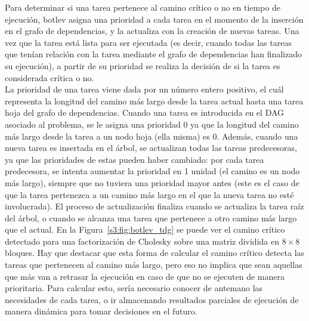 Para determinar si una tarea pertenece al camino crítico o no en tiempo de
ejecución, botlev asigna una prioridad a cada tarea en el momento de la
inserción en el grafo de dependencias, y la actualiza con la creación de
nuevas tareas. Una vez que la tarea está lista para ser ejecutada (es
decir, cuando todas las tareas que tenían relación con la tarea mediante el
grafo de dependencias han finalizado su ejecución), a partir de su
prioridad se realiza la decisión de si la tarea es considerada crítica o no.\\
La prioridad de una tarea viene dada por un número entero positivo, el cuál
representa la longitud del camino más largo desde la tarea actual hasta una
tarea hoja del grafo de dependencias. Cuando una tarea es introducida en el
DAG asociado al problema, se le asigna una prioridad 0 ya que la longitud
del camino más largo desde la tarea a un nodo hoja (ella misma) es
0. Además, cuando una nueva tarea es insertada en el árbol, se actualizan
todas las tareas predecesoras, ya que las prioridades de estas pueden haber
cambiado: por cada tarea predecesora, se intenta aumentar la prioridad en 1
unidad (el camino es un nodo más largo), siempre que no tuviera una
prioridad mayor antes (este es el caso de que la tarea pertenezca a un
camino más largo en el que la nueva tarea no esté involucrada). El proceso
de actualización finaliza cuando se actualiza la tarea raíz del árbol, o
cuando se alcanza una tarea que pertenece a otro camino más largo que el
actual. En la Figura~\ref{s3:fig:botlev_tdg} se puede ver el camino crítico
detectado para una factorización de Cholesky sobre una matriz dividida en
$8\times8$ bloques. Hay que destacar que esta forma de calcular el camino
crítico detecta las tareas que pertenecen al camino más largo, pero eso no
implica que sean aquellas que más van a retrasar la ejecución en caso de
que no se ejecuten de manera prioritaria. Para calcular esto, sería
necesario conocer de antemano las necesidades de cada tarea, o ir
almacenando resultados parciales de ejecución de manera dinámica para tomar
decisiones en el futuro.

